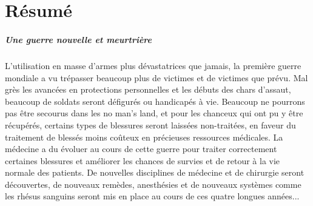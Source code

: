 \documentclass[a4paper, BCOR=0mm, fontsize=12pt, titlepage=firstiscover]{scrreprt}
\begin{document}
	
	
	
	\chapter*{Résumé}
		\paragraph{Une guerre nouvelle et meurtrière}
		L'utilisation en masse d'armes plus dévastatrices que jamais, la première guerre mondiale a vu trépasser beaucoup plus de victimes et de victimes que prévu.
		Mal grès les avancées en protections personnelles et les débuts des chars d'assaut, beaucoup de soldats seront défigurés ou handicapés à vie.
		Beaucoup ne pourrons pas être secourus dans les no man's land, et pour les chanceux qui ont pu y être récupérés, certains types de blessures seront laissées non-traitées, en faveur du traitement de blessés moins coûteux en précieuses ressources médicales. 
		La médecine a du évoluer au cours de cette guerre pour traiter correctement certaines blessures et améliorer les chances de survies et de retour à la vie normale des patients.
		De nouvelles disciplines de médecine et de chirurgie seront découvertes, de nouveaux remèdes, anesthésies et de nouveaux systèmes comme les rhésus sanguins seront mis en place au cours de ces quatre longues années...     
		
		
		
	
	
\end{document}
